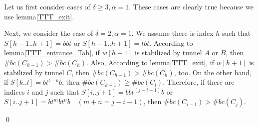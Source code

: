\documentclass[runningheads]{llncs}
\begin{document}
Let us first consider cases of $\delta \geq 3, \alpha = 1$. These cases are clearly true because we use lemma\ref{TTT_exit}.


Next, we consider the case of $\delta = 2, \alpha = 1$. We assume there is index $h$ such that $S[h-1..h+1] = bbt$ or $S[h-1..h+1] = tbt$. According to lemma\ref{TTT_entrance_Tab}, if $w[h+1]$ is stabilized by tunnel $A$ or $B$, then $\#bc(C_{h-1}) > \#bc(C_{h})$. Also,  According to lemma\ref{TTT_exit}, if $w[h+1]$ is stabilized by tunnel $C$, then $\#bc(C_{h-1}) > \#bc(C_{h})$, too.
On the other hand, if $S[k..l] = bt^{l-k}b$, then $\#bc(C_{k-1}) \geq \#bc(C_{l})$. Therefore, if there are indices $i$ and $j$ such that $S[i..j+1] = bbt^{(j-i-1)}b$ or $S[i..j+1] = bt^mbt^nb \quad (m + n = j-i-1)$, then $\#bc(C_{i-1}) > \#bc(C_{j})$.

\qed
\end{document}
